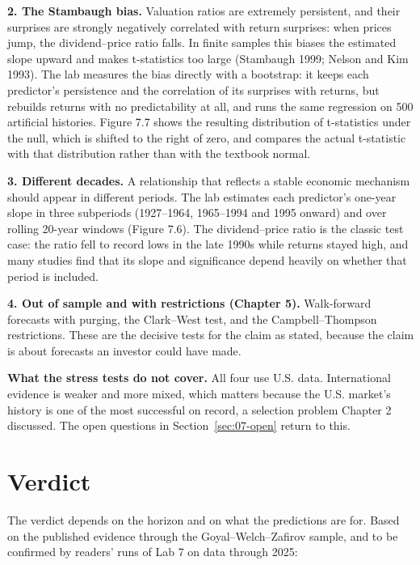 \textbf{2. The Stambaugh bias.} Valuation ratios are extremely persistent, and their surprises are strongly negatively correlated with return surprises: when prices jump, the dividend--price ratio falls. In finite samples this biases the estimated slope upward and makes t-statistics too large (Stambaugh 1999; Nelson and Kim 1993). The lab measures the bias directly with a bootstrap: it keeps each predictor's persistence and the correlation of its surprises with returns, but rebuilds returns with no predictability at all, and runs the same regression on 500 artificial histories. Figure 7.7 shows the resulting distribution of t-statistics under the null, which is shifted to the right of zero, and compares the actual t-statistic with that distribution rather than with the textbook normal.

\textbf{3. Different decades.} A relationship that reflects a stable economic mechanism should appear in different periods. The lab estimates each predictor's one-year slope in three subperiods (1927--1964, 1965--1994 and 1995 onward) and over rolling 20-year windows (Figure 7.6). The dividend--price ratio is the classic test case: the ratio fell to record lows in the late 1990s while returns stayed high, and many studies find that its slope and significance depend heavily on whether that period is included.

\textbf{4. Out of sample and with restrictions (Chapter 5).} Walk-forward forecasts with purging, the Clark--West test, and the Campbell--Thompson restrictions. These are the decisive tests for the claim as stated, because the claim is about forecasts an investor could have made.

\textbf{What the stress tests do not cover.} All four use U.S. data. International evidence is weaker and more mixed, which matters because the U.S. market's history is one of the most successful on record, a selection problem Chapter 2 discussed. The open questions in Section~\ref{sec:07-open} return to this.

\section{Verdict}
\label{sec:07-verdict}

The verdict depends on the horizon and on what the predictions are for. Based on the published evidence through the Goyal--Welch--Zafirov sample, and to be confirmed by readers' runs of Lab 7 on data through 2025:

